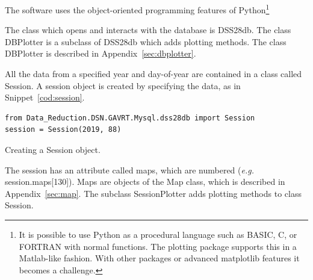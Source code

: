 \documentclass[letterpaper,11pt]{report}
\begin{document}
The software uses the object-oriented programming features of 
Python\footnote{It is possible to use Python as a procedural language such as
BASIC, C, or FORTRAN with normal functions.  The plotting package supports this 
in a 
Matlab{\textregistered}-like fashion.  With other packages or advanced
{\ttfamily matplotlib} features it becomes a challenge.}
\begin{flushright}
\end{flushright}

\noindent The class which opens and interacts with the database is {\ttfamily DSS28db}.
The class {\ttfamily DBPlotter} is a subclass of {\ttfamily DSS28db} which
adds plotting methods. The class {\ttfamily DBPlotter} is described in
Appendix~\ref{sec:dbplotter}.

All the data from a specified year and day-of-year are contained in a
class called {\ttfamily Session}.  A session object is created by specifying
the data, as in Snippet~\ref{cod:session}.
\begin{code}[h!tb]
    \begin{center}
        {\footnotesize \begin{verbatim}
from Data_Reduction.DSN.GAVRT.Mysql.dss28db import Session
session = Session(2019, 88)\end{verbatim}
        }\caption{\label{cod:session}Creating a {\ttfamily Session} object.}
    \end{center}
\end{code}
\noindent The session has an attribute called {\ttfamily maps}, which are
numbered ({\itshape e.g.} {\ttfamily session.maps[130]}).  Maps are objects of the
{\ttfamily Map} class, which is described in Appendix~\ref{sec:map}.
The subclass {\ttfamily SessionPlotter} adds plotting methods to
class {\ttfamily Session}.
\end{document}
